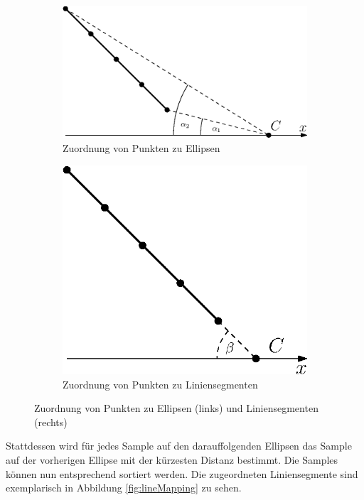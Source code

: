 \begin{figure}[!htb]
	\centering
	\begin{subfigure}{.6\textwidth}
		\centering
		\includegraphics[width=.9\textwidth]{images/sampleMappingProblem.eps}
		\caption{Zuordnung von Punkten zu Ellipsen}
		\label{fig:sampleMappingProblem1}
	\end{subfigure}%
	\begin{subfigure}{.4\textwidth}
		\centering
		\includegraphics[width=.9\textwidth]{images/sampleMappingProblem2.eps}
		\caption{Zuordnung von Punkten zu Liniensegmenten}
		\label{fig:sampleMappingProblem2}
	\end{subfigure}
	\caption{Zuordnung von Punkten zu Ellipsen (links) und Liniensegmenten (rechts)}
	\label{fig:sampleMappingProblem}
\end{figure}

Stattdessen wird für jedes Sample auf den darauffolgenden Ellipsen das Sample auf der vorherigen Ellipse mit der kürzesten Distanz bestimmt.
Die Samples können nun entsprechend sortiert werden. Die zugeordneten Liniensegmente sind exemplarisch in Abbildung \ref{fig:lineMapping} zu sehen. 


